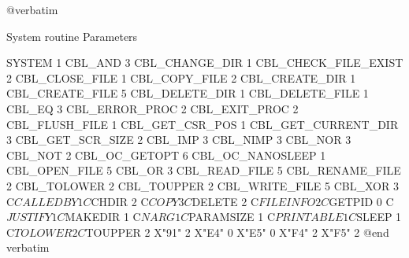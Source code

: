 @verbatim

System routine			Parameters

SYSTEM				1
CBL_AND				3
CBL_CHANGE_DIR			1
CBL_CHECK_FILE_EXIST		2
CBL_CLOSE_FILE			1
CBL_COPY_FILE			2
CBL_CREATE_DIR			1
CBL_CREATE_FILE			5
CBL_DELETE_DIR			1
CBL_DELETE_FILE			1
CBL_EQ				3
CBL_ERROR_PROC			2
CBL_EXIT_PROC			2
CBL_FLUSH_FILE			1
CBL_GET_CSR_POS			1
CBL_GET_CURRENT_DIR		3
CBL_GET_SCR_SIZE		2
CBL_IMP				3
CBL_NIMP			3
CBL_NOR				3
CBL_NOT				2
CBL_OC_GETOPT			6
CBL_OC_NANOSLEEP		1
CBL_OPEN_FILE			5
CBL_OR				3
CBL_READ_FILE			5
CBL_RENAME_FILE			2
CBL_TOLOWER			2
CBL_TOUPPER			2
CBL_WRITE_FILE			5
CBL_XOR				3
C$CALLEDBY			1
C$CHDIR				2
C$COPY				3
C$DELETE			2
C$FILEINFO			2
C$GETPID			0
C$JUSTIFY			1
C$MAKEDIR			1
C$NARG				1
C$PARAMSIZE			1
C$PRINTABLE			1
C$SLEEP				1
C$TOLOWER			2
C$TOUPPER			2
X"91"				2
X"E4"				0
X"E5"				0
X"F4"				2
X"F5"				2
@end verbatim

